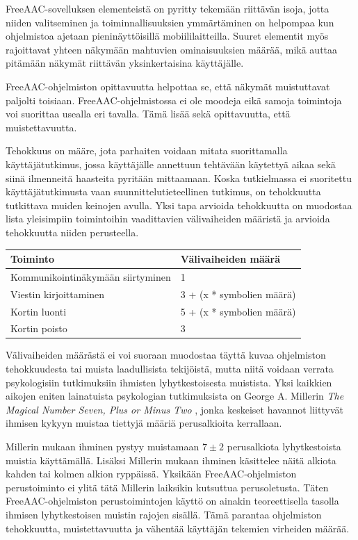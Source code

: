 \documentclass[utf8]{gradu3}
\begin{document}
FreeAAC-sovelluksen elementeistä on pyritty tekemään riittävän isoja, jotta niiden valitseminen ja toiminnallisuuksien ymmärtäminen on helpompaa kun ohjelmistoa ajetaan pieninäyttöisillä mobiililaitteilla. Suuret elementit myös rajoittavat yhteen näkymään mahtuvien ominaisuuksien määrää, mikä auttaa pitämään näkymät riittävän yksinkertaisina käyttäjälle.

FreeAAC-ohjelmiston opittavuutta helpottaa se, että näkymät muistuttavat paljolti toisiaan. FreeAAC-ohjelmistossa ei ole moodeja eikä samoja toimintoja voi suorittaa usealla eri tavalla. Tämä lisää sekä opittavuutta, että muistettavuutta. 

Tehokkuus on määre, jota parhaiten voidaan mitata suorittamalla käyttäjätutkimus, jossa käyttäjälle annettuun tehtävään käytettyä aikaa sekä siinä ilmenneitä haasteita pyritään mittaamaan. Koska tutkielmassa ei suoritettu käyttäjätutkimusta vaan suunnittelutieteellinen tutkimus, on tehokkuutta tutkittava muiden keinojen avulla. Yksi tapa arvioida tehokkuutta on muodostaa lista yleisimpiin toimintoihin vaadittavien välivaiheiden määristä ja arvioida tehokkuutta niiden perusteella.

\begin{center}
    \begin{tabular}{| l | l |}
    \hline
    \textbf{Toiminto} & \textbf{Välivaiheiden määrä} \\ \hline
    Kommunikointinäkymään siirtyminen & 1  \\ \hline
    Viestin kirjoittaminen & 3 + (x * symbolien määrä)\\ \hline
    Kortin luonti & 5 + (x * symbolien määrä) \\ \hline
    Kortin poisto & 3  \\ \hline
    \end{tabular}
\end{center}

Välivaiheiden määrästä ei voi suoraan muodostaa täyttä kuvaa ohjelmiston tehokkuudesta tai muista laadullisista tekijöistä, mutta niitä voidaan verrata psykologisiin tutkimuksiin ihmisten lyhytkestoisesta muistista. Yksi kaikkien aikojen eniten lainatuista psykologian tutkimuksista \parencite[]{most-quoted-psych} on George A. Millerin \textit{The Magical Number Seven, Plus or Minus Two} \parencite[]{magical-number-seven}, jonka keskeiset havannot liittyvät ihmisen kykyyn muistaa tiettyjä määriä perusalkioita kerrallaan.

Millerin mukaan ihminen pystyy muistamaan $7 \pm 2$ perusalkiota lyhytkestoista muistia käyttämällä. Lisäksi Millerin mukaan ihminen käsittelee näitä alkiota kahden tai kolmen alkion ryppäissä. Yksikään FreeAAC-ohjelmiston perustoiminto ei ylitä tätä Millerin laiksikin kutsuttua perusoletusta. Täten FreeAAC-ohjelmiston perustoimintojen käyttö on ainakin teoreettisella tasolla ihmisen lyhytkestoisen muistin rajojen sisällä. Tämä parantaa ohjelmiston tehokkuutta, muistettavuutta ja vähentää käyttäjän tekemien virheiden määrää.
\end{document}
